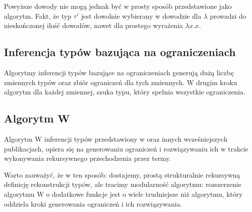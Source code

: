 \documentclass{article}
\begin{document}
Powyższe dowody nie mogą jednak być w prosty sposób przedstawione jako algorytm. Fakt, że typ $\tau'$ jest dowolnie wybierany w dowodzie dla $\lambda$ prowadzi do nieskończonej ilość dowodów, nawet dla prostego wyrażenia $\lambda x.x$.
\subsection{Inferencja typów bazująca na ograniczeniach}
Algorytmy inferencji typów bazujące na ograniczeniach generują dużą liczbę zmiennych typów oraz zbiór ograniczeń dla tych zmiennych. W drugim kroku algorytm dla każdej zmiennej, szuka typu, który spełnia wszystkie ograniczenia.
\subsection{Algorytm W}
Algorytm W inferencji typów przedstawiony w \cite{Milner__1978} oraz innych wcześniejszych publikacjach, opiera się na generowaniu ograniczeń i rozwiązywaniu ich w trakcie wykonywania rekursywnego przechodzenia przez termy.

Warto zauważyć, że w ten sposób: dostajemy, prostą strukturalnie rekursywną definicję rekonstrukcji typów, ale tracimy modularność algorytmu: rozszerzenie algorytmu W o dodatkowe funkcje jest o wiele trudniejsze niż algorytmu, który oddziela kroki generowania ograniczeń i ich rozwiązywania.
\end{document}
